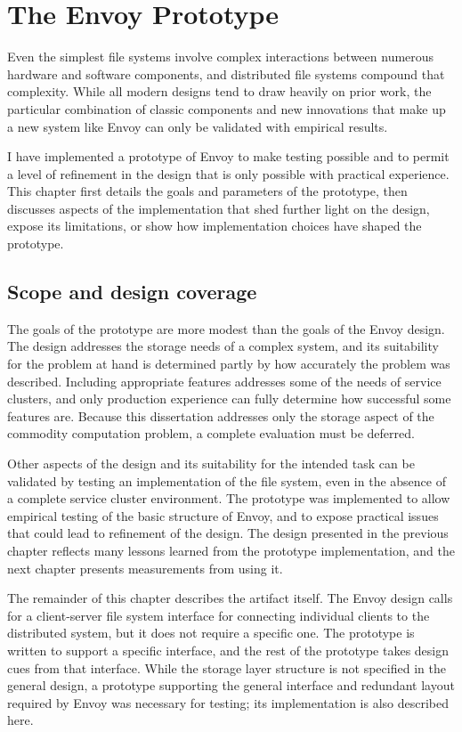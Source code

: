 \chapter{The Envoy Prototype}\label{cha:implementation}

Even the simplest file systems involve complex interactions between numerous hardware and software components, and distributed file systems compound that complexity. While all modern designs tend to draw heavily on prior work, the particular combination of classic components and new innovations that make up a new system like Envoy can only be validated with empirical results.

I have implemented a prototype of Envoy to make testing possible and to permit a level of refinement in the design that is only possible with practical experience. This chapter first details the goals and parameters of the prototype, then discusses aspects of the implementation that shed further light on the design, expose its limitations, or show how implementation choices have shaped the prototype.

\section{Scope and design coverage}

The goals of the prototype are more modest than the goals of the Envoy design. The design addresses the storage needs of a complex system, and its suitability for the problem at hand is determined partly by how accurately the problem was described. Including appropriate features addresses some of the needs of service clusters, and only production experience can fully determine how successful some features are. Because this dissertation addresses only the storage aspect of the commodity computation problem, a complete evaluation must be deferred.

Other aspects of the design and its suitability for the intended task can be validated by testing an implementation of the file system, even in the absence of a complete service cluster environment. The prototype was implemented to allow empirical testing of the basic structure of Envoy, and to expose practical issues that could lead to refinement of the design. The design presented in the previous chapter reflects many lessons learned from the prototype implementation, and the next chapter presents measurements from using it.

The remainder of this chapter describes the artifact itself. The Envoy design calls for a client-server file system interface for connecting individual clients to the distributed system, but it does not require a specific one. The prototype is written to support a specific interface, and the rest of the prototype takes design cues from that interface. While the storage layer structure is not specified in the general design, a prototype supporting the general interface and redundant layout required by Envoy was necessary for testing; its implementation is also described here.

